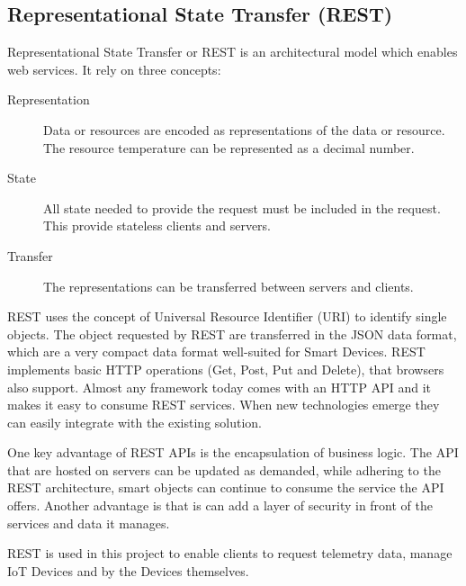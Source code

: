 \subsection{Representational State Transfer (REST)}
Representational State Transfer or REST is an architectural model which enables web services. It rely on three concepts: 
\begin{description}
    \item[Representation] Data or resources are encoded as representations of the data or resource. The resource temperature can be represented as a decimal number.
    \item[State] All state needed to provide the request must be included in the request. This provide stateless clients and servers. 
    \item[Transfer] The representations can be transferred between servers and clients.
\end{description} \cite{smartthings}

REST uses the concept of Universal Resource Identifier (URI) to identify single objects. The object requested by REST are transferred in the JSON data format, which are a very compact data format well-suited for Smart Devices. REST implements basic HTTP operations (Get, Post, Put and Delete), that browsers also support. Almost any framework today comes with an HTTP API and it makes it easy to consume REST services. When new technologies emerge they can easily integrate with the existing solution.  

One key advantage of REST APIs is the encapsulation of business logic. The API that are hosted on servers can be updated as demanded, while adhering to the REST architecture, smart objects can continue to consume the service the API offers. Another advantage is that is can add a layer of security in front of the services and data it manages.

REST is used in this project to enable clients to request telemetry data, manage IoT Devices and by the Devices themselves. 